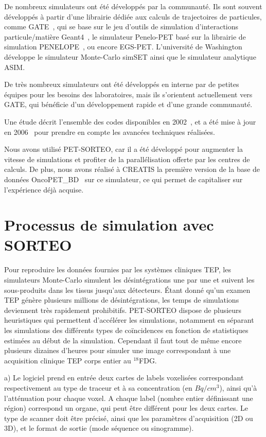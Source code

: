De nombreux simulateurs ont été développés par la communauté. Ils sont souvent développés à partir d'une librairie dédiée aux calculs de trajectoires de particules, comme GATE~\cite{jan2004gate}, qui se base sur le jeu d'outils de simulation d'interactions particule/matière Geant4~\cite{allison2006geant4}, le simulateur Penelo-PET\cite{espana2009penelopet} basé sur la librairie de simulation  PENELOPE~\cite{salvat2006penelope}, ou encore EGS-PET. L’université de Washington développe le simulateur Monte-Carlo simSET ainsi que le simulateur analytique ASIM. 

De très nombreux simulateurs ont été développés en interne par de petites équipes pour les besoins des laboratoires, mais ils s'orientent actuellement  vers GATE, qui bénéficie d'un développement rapide et d'une grande communauté.

Une étude décrit l'ensemble des codes disponibles en 2002~\cite{buvat2002monte}, et a été mise à jour en 2006~\cite{buvat2006monte} pour prendre en compte les avancées techniques réalisées.

Nous avons utilisé PET-SORTEO, car il a été développé pour augmenter la vitesse de simulations et profiter de la parallélisation offerte par les centres de calculs. De plus, nous avons réalisé à CREATIS la première version de la base de données OncoPET\_BD~\cite{tomei2010oncopet_db} sur ce simulateur, ce qui permet de capitaliser sur l’expérience déjà acquise. 

	\section{Processus de simulation avec SORTEO}
\label{lab:simuSORTEO}
Pour reproduire les données fournies par les systèmes cliniques TEP, les simulateurs Monte-Carlo simulent les désintégrations une par une et suivent les sous-produits dans les tissus jusqu'aux détecteurs. Étant donné qu'un examen TEP génère plusieurs millions de désintégrations, les temps de simulations deviennent très rapidement prohibitifs. PET-SORTEO dispose de plusieurs heuristiques qui permettent d'accélérer les simulations, notamment en séparant les simulations des différents types de coïncidences en fonction de statistiques estimées au début de la simulation. Cependant il faut tout de même encore plusieurs dizaines d'heures pour simuler une image correspondant à une acquisition clinique TEP corps entier au $^{18}$FDG.

a) Le logiciel prend en entrée deux cartes de labels voxelisées correspondant respectivement au type de traceur et à sa concentration (en $Bq/cm^3$), ainsi qu'à l'atténuation pour chaque voxel. A chaque label (nombre entier définissant une région) correspond un organe, qui peut être différent pour les deux cartes. Le type de scanner doit être précisé, ainsi que les paramètres d'acquisition (2D ou 3D), et le format de sortie (mode séquence ou sinogramme).

